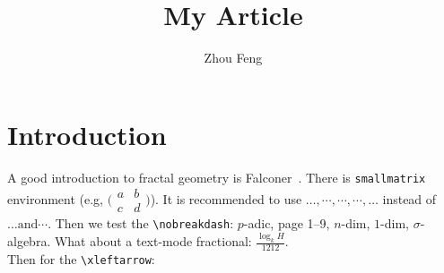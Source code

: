 \documentclass[12pt]{amsart}
\title[small title]{My Article}
\author{Zhou Feng}
\theoremstyle{plain}
\theoremstyle{definition}
\theoremstyle{remark}
\numberwithin{equation}{section} %
\newcommand{\Ndash}{\nobreakdash--}
\newcommand{\sigmaAlg}{$\sigma$\nobreakdash-algebra}
\newcommand{\ndiml}[1][n]{$#1$\nobreakdash-dim}
\newcommand{\padic}{$p$\nobreakdash-adic}
\begin{document}
\setlength{\baselineskip}{15.2pt}
%	 
\maketitle

%
%
%
%
%

\section{Introduction}\label{sec:intro}
A good introduction to fractal geometry is Falconer~\cite{Falconer2003}. There is \verb|smallmatrix| environment (e.g, $\big(\begin{smallmatrix}
			a & b\\ c&d
		\end{smallmatrix}\big)$). It is recommended to use $ \dotsc, \dotsb, \dotsm, \dotsi, \dotso $ instead of $ \ldots \text{and} \cdots$. Then we test the \verb|\nobreakdash|: \padic, page 1\Ndash9, \ndiml, \ndiml[1], \sigmaAlg.
What about a text-mode fractional: $ \tfrac{\log_{k} H}{1212} $.\\[20pt]
Then for the \verb|\xleftarrow|:
\end{document}
